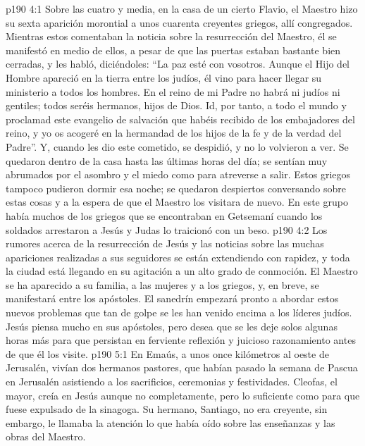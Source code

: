 \vs p190 4:1 Sobre las cuatro y media, en la casa de un cierto Flavio, el Maestro hizo su sexta aparición morontial a unos cuarenta creyentes griegos, allí congregados. Mientras estos comentaban la noticia sobre la resurrección del Maestro, él se manifestó en medio de ellos, a pesar de que las puertas estaban bastante bien cerradas, y les habló, diciéndoles: “La paz esté con vosotros. Aunque el Hijo del Hombre apareció en la tierra entre los judíos, él vino para hacer llegar su ministerio a todos los hombres. En el reino de mi Padre no habrá ni judíos ni gentiles; todos seréis hermanos, hijos de Dios. Id, por tanto, a todo el mundo y proclamad este evangelio de salvación que habéis recibido de los embajadores del reino, y yo os acogeré en la hermandad de los hijos de la fe y de la verdad del Padre”. Y, cuando les dio este cometido, se despidió, y no lo volvieron a ver. Se quedaron dentro de la casa hasta las últimas horas del día; se sentían muy abrumados por el asombro y el miedo como para atreverse a salir. Estos griegos tampoco pudieron dormir esa noche; se quedaron despiertos conversando sobre estas cosas y a la espera de que el Maestro los visitara de nuevo. En este grupo había muchos de los griegos que se encontraban en Getsemaní cuando los soldados arrestaron a Jesús y Judas lo traicionó con un beso.
\vs p190 4:2 \pc Los rumores acerca de la resurrección de Jesús y las noticias sobre las muchas apariciones realizadas a sus seguidores se están extendiendo con rapidez, y toda la ciudad está llegando en su agitación a un alto grado de conmoción. El Maestro se ha aparecido a su familia, a las mujeres y a los griegos, y, en breve, se manifestará entre los apóstoles. El sanedrín empezará pronto a abordar estos nuevos problemas que tan de golpe se les han venido encima a los líderes judíos. Jesús piensa mucho en sus apóstoles, pero desea que se les deje solos algunas horas más para que persistan en ferviente reflexión y juicioso razonamiento antes de que él los visite.
\vs p190 5:1 En Emaús, a unos once kilómetros al oeste de Jerusalén, vivían dos hermanos pastores, que habían pasado la semana de Pascua en Jerusalén asistiendo a los sacrificios, ceremonias y festividades. Cleofas, el mayor, creía en Jesús aunque no completamente, pero lo suficiente como para que fuese expulsado de la sinagoga. Su hermano, Santiago, no era creyente, sin embargo, le llamaba la atención lo que había oído sobre las enseñanzas y las obras del Maestro.
